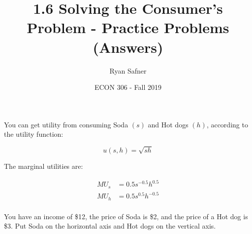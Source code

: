\documentclass[12 pt]{exam}
\title{1.6 Solving the Consumer's Problem - Practice Problems (Answers)}
\author{Ryan Safner}
\date{ECON 306 - Fall 2019}
\begin{document}
\maketitle

You can get utility from consuming Soda $(s)$ and Hot dogs $(h)$, according to the utility function:

\begin{equation*}
u(s,h)=\sqrt{sh}\end{equation*}

The marginal utilities are:

\begin{align*}
MU_s&=0.5s^{-0.5}h^{0.5}	\\
MU_h&=0.5s^{0.5}h^{-0.5} \\ \end{align*}

You have an income of \$12, the price of Soda is \$2, and the price of a Hot dog is \$3. Put Soda on the horizontal axis and Hot dogs on the vertical axis.
\end{document}
